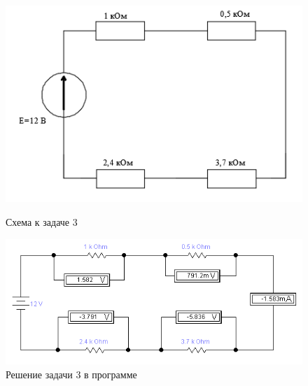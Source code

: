 \begin{figure}[H]
\begin{changemargin}{-1.5cm}{-2cm}
  \begin{center}
    \begin{minipage}[h]{0.4\linewidth}
        \includegraphics[width=1\textwidth]{authors/stepanuk-2-fig-7.png}
        \caption{Схема к задаче 3}
        \label{fig:stepanuk-2-fig-7}
    \end{minipage}
\hfill
    \begin{minipage}[h]{0.55\linewidth}
        \includegraphics[width=1\textwidth]{authors/stepanuk-2-fig-8.png}
        \caption{Решение задачи 3 в программе}
        \label{fig:stepanuk-2-fig-8}
    \end{minipage}


  \end{center}
\end{changemargin}

\end{figure}
